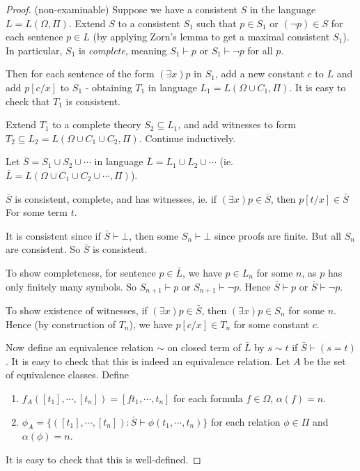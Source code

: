 \documentclass[a4paper]{article}
\begin{document}
\begin{proof}(non-examinable)
  Suppose we have a consistent $S$ in the language $L = L(\Omega, \Pi)$. Extend $S$ to a consistent $S_1$ such that $p\in S_1$ or $(\neg p)\in S$ for each sentence $p\in L$ (by applying Zorn's lemma to get a maximal consistent $S_1$). In particular, $S_1$ is \emph{complete}, meaning $S_1\vdash p$ or $S_1 \vdash \neg p$ for all $p$.

  Then for each sentence of the form $(\exists x)p$ in $S_1$, add a new constant $c$ to $L$ and add $p[c/x]$ to $S_1$ - obtaining $T_1$ in language $L_1 = L(\Omega \cup C_1, \Pi)$. It is easy to check that $T_1$ is consistent.

  Extend $T_1$ to a complete theory $S_2\subseteq L_1$, and add witnesses to form $T_2 \subseteq L_2 = L(\Omega \cup C_1 \cup C_2, \Pi)$. Continue inductively.

  Let $\bar S = S_1 \cup S_2 \cup \cdots$ in language $\bar L = L_1\cup L_2\cup \cdots$ (ie. $\bar L = L(\Omega\cup C_1\cup C_2\cup\cdots, \Pi)$).

  \begin{claim}
    $\bar S$ is consistent, complete, and has witnesses, ie. if $(\exists x)p \in \bar S$, then $p[t/x]\in \bar S$ For some term $t$.
  \end{claim}

  It is consistent since if $\bar S \vdash \bot$, then some $S_n \vdash \bot$ since proofs are finite. But all $S_n$ are consistent. So $\bar S$ is consistent.

  To show completeness, for sentence $p\in \bar L$, we have $p\in L_n$ for some $n$, as $p$ has only finitely many symbols.  So $S_{n + 1} \vdash p$ or $S_{n + 1}\vdash \neg p$. Hence $\bar S \vdash p$ or $\bar S \vdash \neg p$.

  To show existence of witnesses, if $(\exists x)p \in \bar S$, then $(\exists x) p\in S_n$ for some $n$. Hence (by construction of $T_n$), we have $p[c/x] \in T_n$ for some constant $c$.

  Now define an equivalence relation $\sim$ on closed term of $\bar L$ by $s\sim t$ if $\bar S\vdash (s = t)$. It is easy to check that this is indeed an equivalence relation. Let $A$ be the set of equivalence classes. Define
  \begin{enumerate}
    \item $f_A([t_1],\cdots, [t_n]) = [f t_1, \cdots, t_n]$ for each formula $f\in \Omega$, $\alpha(f) = n$.
    \item $\phi_A = \{([t_1], \cdots, [t_n]): \bar S \vdash \phi(t_1, \cdots, t_n)\}$ for each relation $\phi \in \Pi$ and $\alpha (\phi) = n$.
  \end{enumerate}
  It is easy to check that this is well-defined.


\end{proof}
\end{document}
